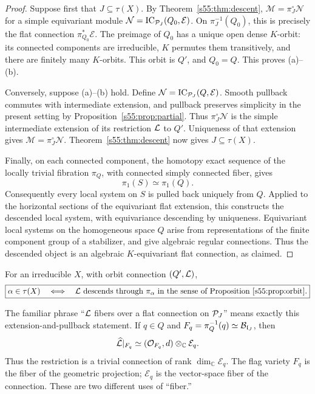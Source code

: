 \begin{proof}
Suppose first that $J\subseteq\tau(X)$. By Theorem~\ref{s55:thm:descent},
$\mathcal M=\pi_J^\circ\mathcal N$ for a simple equivariant module
$\mathcal N=\operatorname{IC}_{\mathcal{P}_J}(Q_0,\mathcal E)$.
On $\pi_J^{-1}(Q_0)$, this is precisely the flat connection
$\pi_{Q_0}^*\mathcal E$. The preimage of $Q_0$ has a unique open dense
$K$-orbit: its connected components are irreducible, $K$ permutes them
transitively, and there are finitely many $K$-orbits. This orbit is $Q'$,
and $Q_0=Q$. This proves (a)--(b).

Conversely, suppose (a)--(b) hold. Define
$\mathcal N=\operatorname{IC}_{\mathcal{P}_J}(Q,\mathcal E)$.
Smooth pullback commutes with intermediate extension, and pullback
preserves simplicity in the present setting by
Proposition~\ref{s55:prop:partial}. Thus $\pi_J^\circ\mathcal N$ is the simple
intermediate extension of its restriction $\mathcal{L}$ to $Q'$. Uniqueness of
that extension gives $\mathcal M=\pi_J^\circ\mathcal N$.
Theorem~\ref{s55:thm:descent} now gives $J\subseteq\tau(X)$.

Finally, on each connected component, the homotopy exact sequence of
the locally trivial fibration $\pi_Q$, with connected simply connected
fiber, gives
\[
 \pi_1(S)\simeq\pi_1(Q).
\]
Consequently every local system on $S$ is pulled back uniquely from
$Q$. Applied to the horizontal sections of the equivariant flat
extension, this constructs the descended local system, with equivariance
descending by uniqueness. Equivariant local systems on the homogeneous
space $Q$ arise from representations of the finite component group of
a stabilizer, and give algebraic regular connections. Thus the
descended object is an algebraic $K$-equivariant flat connection, as claimed.
\end{proof}

\begin{cor}
For an irreducible $X$, with orbit connection $(Q',\mathcal{L})$,
\[
 \boxed{\alpha\in\tau(X)
 \quad\Longleftrightarrow\quad
 \mathcal{L}\text{ descends through }\pi_\alpha
 \text{ in the sense of Proposition~\ref{s55:prop:orbit}.}}
\]
\end{cor}

The familiar phrase ``$\mathcal{L}$ fibers over a flat connection on $\mathcal{P}_J$''
means exactly this extension-and-pullback statement. If $q\in Q$ and
$F_q=\pi_Q^{-1}(q)\simeq\mathcal B_{\mathfrak{l}_J}$, then
\[
 \widehat{\mathcal{L}}|_{F_q}
   \simeq (\mathcal O_{F_q},d)\otimes_{\mathbb C}\mathcal E_q.
\]
Thus the restriction is a trivial connection of rank
$\dim_{\mathbb C}\mathcal E_q$. The flag variety $F_q$ is the fiber of
the geometric projection; $\mathcal E_q$ is the vector-space fiber of
the connection. These are two different uses of ``fiber.''

